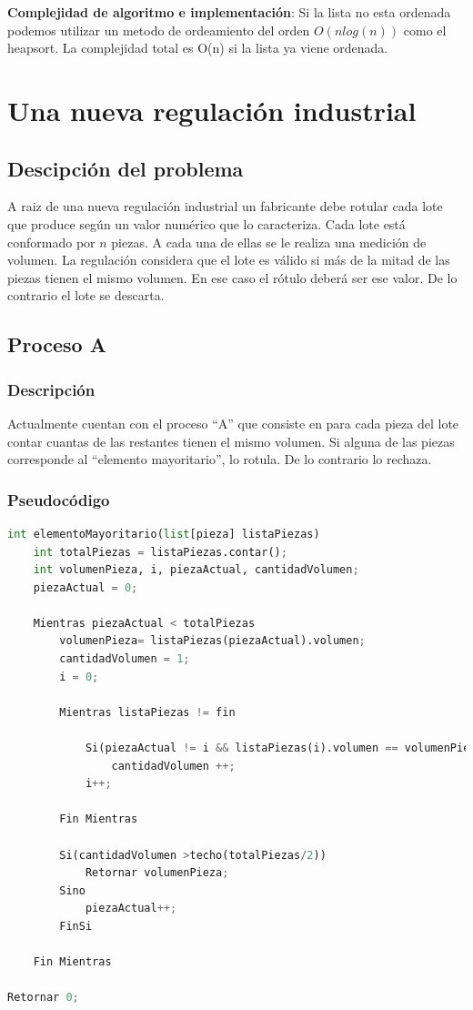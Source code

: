 \documentclass{article}
\begin{document}
\textbf{Complejidad de algoritmo e implementación}: Si la lista no esta ordenada podemos utilizar un metodo de ordeamiento del orden \(O(n log(n))\) como el heapsort. 
La complejidad total es O(n) si la lista ya viene ordenada. 

\newpage
\section{Una nueva regulación industrial}

\subsection{Descipción del problema}
A raiz de una nueva regulación industrial un fabricante debe rotular cada lote que produce según un valor numérico que lo caracteriza. 
Cada lote está conformado por \(n\) piezas. A cada una de ellas se le realiza una medición de volumen. La regulación considera que el lote es válido si más de la mitad de las piezas tienen el mismo volumen. 
En ese caso el rótulo deberá ser ese valor. De lo contrario el lote se descarta.

\subsection{Proceso A}

\subsubsection{Descripción}
Actualmente cuentan con el proceso “A” que consiste en para cada pieza del lote contar cuantas de las restantes tienen el mismo volumen. 
Si alguna de las piezas corresponde al “elemento mayoritario”, lo rotula. De lo contrario lo rechaza.

\subsubsection{Pseudocódigo}

\begin{lstlisting}[language=Python, caption=Algoritmo del proceso A]
int elementoMayoritario(list[pieza] listaPiezas)
	int totalPiezas = listaPiezas.contar();
	int volumenPieza, i, piezaActual, cantidadVolumen;
	piezaActual = 0;

	Mientras piezaActual < totalPiezas
        volumenPieza= listaPiezas(piezaActual).volumen;
        cantidadVolumen = 1;
		i = 0;
		
		Mientras listaPiezas != fin

			Si(piezaActual != i && listaPiezas(i).volumen == volumenPieza)
				cantidadVolumen ++;
			i++;

		Fin Mientras
			
        Si(cantidadVolumen >techo(totalPiezas/2)) 
		    Retornar volumenPieza;
        Sino
            piezaActual++;
        FinSi

    Fin Mientras

Retornar 0; 

\end{lstlisting}
\end{document}
